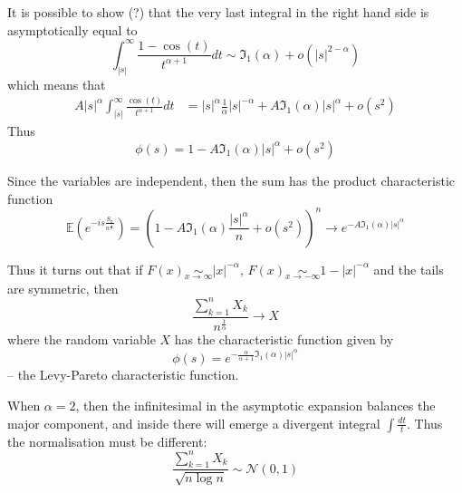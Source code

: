 \documentclass[a4paper]{article}
\newcommand{\brac}[1]{{\left ( #1 \right )}}
\newcommand{\abs}[1]{{\left | #1 \right |}}
\newcommand{\Ical}{\mathfrak{I}}
\newcommand{\Ex}{\mathbb{E}}
\begin{document}
It is possible to show (?) that the very last integral in the right hand side is asymptotically equal to
\[\int_\abs{s}^\infty \frac{1-\cos(t)}{t^{\alpha+1}}dt \sim \Ical_1(\alpha) + o(\abs{s}^{2-\alpha})\]
which means that
\begin{align*}
A \abs{s}^\alpha \int_\abs{s}^\infty \frac{\cos(t)}{t^{\alpha+1}}dt
&= \abs{s}^\alpha \frac{1}{\alpha} \abs{s}^{-\alpha} + A \Ical_1(\alpha)\abs{s}^\alpha + o(s^2)
\end{align*}
Thus
\[\phi(s) = 1 - A \Ical_1(\alpha) \abs{s}^\alpha + o(s^2)\]

Since the variables are independent, then the sum has the product characteristic function
\[\Ex\brac{ e^{-is\frac{S_n}{n^\frac{1}{\alpha}}} }
= \brac{1 - A \Ical_1(\alpha) \frac{\abs{s}^\alpha}{n} + o(s^2)}^n \to e^{-A \Ical_1(\alpha)\abs{s}^\alpha}\]

Thus it turns out that if $F(x)\underset{x\to\infty}{\sim} \abs{x}^{-\alpha}$,
$F(x)\underset{x\to-\infty}{\sim} 1-\abs{x}^{-\alpha}$ and the tails are symmetric,
then
\[\frac{\sum_{k=1}^{n}X_k}{n^\frac{1}{\alpha}}\to X\]
where the random variable $X$ has the characteristic function given by
\[\phi(s) = e^{-\frac{\alpha}{\alpha+1} \Ical_1(\alpha)\abs{s}^\alpha}\]
-- the Levy-Pareto characteristic function.

When $\alpha=2$, then the infinitesimal in the asymptotic expansion balances the major component, and inside there will emerge a divergent integral $\int \frac{dt}{t}$.
Thus the normalisation must be different:
\[\frac{\sum_{k=1}^n X_k}{\sqrt{n\log n}}\sim \mathcal{N}(0,1)\]
\end{document}
